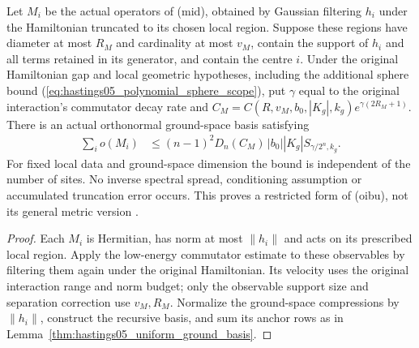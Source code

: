 \begin{lemma}
    \label{thm:hastings05_uniform_truncated_basis}
    \leanok
    Let $M_i$ be the actual operators of (mid), obtained by Gaussian
    filtering $h_i$ under the Hamiltonian truncated to its chosen local
    region. Suppose these regions have diameter at most $R_M$ and
    cardinality at most $v_M$, contain the support of $h_i$ and all terms
    retained in its generator, and contain the centre $i$.
    Under the original Hamiltonian gap and local geometric hypotheses,
    including the additional sphere bound
    (\ref{eq:hastings05_polynomial_sphere_scope}),
    put $\gamma$ equal to the original interaction's commutator decay rate
    and $C_M=C(R,v_M,b_0,|K_g|,k_g)e^{\gamma(2R_M+1)}$.
    There is an actual orthonormal ground-space basis satisfying
    \begin{align}
        \sum_i o(M_i)
         & \le(n-1)^2D_n(C_M)\,|b_0||K_g|S_{\gamma/2^n,k_g}.
        \label{eq:hastings05_uniform_truncated_basis}
    \end{align}
    For fixed local data and ground-space dimension the bound is
    independent of the number of sites. No inverse spectral spread,
    conditioning assumption or accumulated truncation error occurs. This
    proves a restricted form of (oibu), not its general metric version
    \cite{gap:hastings05_geometric_growth_scope}.
\end{lemma}
\begin{proof}\leanok
    Each $M_i$ is Hermitian, has norm at most $\|h_i\|$ and acts on its
    prescribed local region. Apply the low-energy commutator estimate to
    these observables by filtering them again under the original
    Hamiltonian. Its velocity uses the original interaction range and
    norm budget; only the observable support size and separation correction
    use $v_M,R_M$. Normalize the ground-space compressions by $\|h_i\|$,
    construct the recursive basis, and sum its anchor rows as in
    Lemma~\ref{thm:hastings05_uniform_ground_basis}.
\end{proof}

